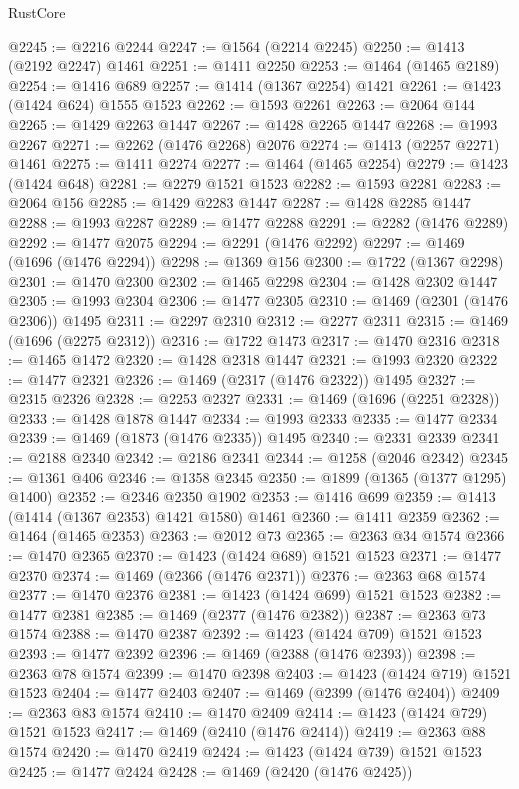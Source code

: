 \begin{lexlean}{RustCore}
\begin{coremodule}
@2245 := @2216 @2244
@2247 := @1564 (@2214 @2245)
@2250 := @1413 (@2192 @2247) @1461
@2251 := @1411 @2250
@2253 := @1464 (@1465 @2189)
@2254 := @1416 @689
@2257 := @1414 (@1367 @2254) @1421
@2261 := @1423 (@1424 @624) @1555 @1523
@2262 := @1593 @2261
@2263 := @2064 @144
@2265 := @1429 @2263 @1447
@2267 := @1428 @2265 @1447
@2268 := @1993 @2267
@2271 := @2262 (@1476 @2268) @2076
@2274 := @1413 (@2257 @2271) @1461
@2275 := @1411 @2274
@2277 := @1464 (@1465 @2254)
@2279 := @1423 (@1424 @648)
@2281 := @2279 @1521 @1523
@2282 := @1593 @2281
@2283 := @2064 @156
@2285 := @1429 @2283 @1447
@2287 := @1428 @2285 @1447
@2288 := @1993 @2287
@2289 := @1477 @2288
@2291 := @2282 (@1476 @2289)
@2292 := @1477 @2075
@2294 := @2291 (@1476 @2292)
@2297 := @1469 (@1696 (@1476 @2294))
@2298 := @1369 @156
@2300 := @1722 (@1367 @2298)
@2301 := @1470 @2300
@2302 := @1465 @2298
@2304 := @1428 @2302 @1447
@2305 := @1993 @2304
@2306 := @1477 @2305
@2310 := @1469 (@2301 (@1476 @2306)) @1495
@2311 := @2297 @2310
@2312 := @2277 @2311
@2315 := @1469 (@1696 (@2275 @2312))
@2316 := @1722 @1473
@2317 := @1470 @2316
@2318 := @1465 @1472
@2320 := @1428 @2318 @1447
@2321 := @1993 @2320
@2322 := @1477 @2321
@2326 := @1469 (@2317 (@1476 @2322)) @1495
@2327 := @2315 @2326
@2328 := @2253 @2327
@2331 := @1469 (@1696 (@2251 @2328))
@2333 := @1428 @1878 @1447
@2334 := @1993 @2333
@2335 := @1477 @2334
@2339 := @1469 (@1873 (@1476 @2335)) @1495
@2340 := @2331 @2339
@2341 := @2188 @2340
@2342 := @2186 @2341
@2344 := @1258 (@2046 @2342)
@2345 := @1361 @406
@2346 := @1358 @2345
@2350 := @1899 (@1365 (@1377 @1295) @1400)
@2352 := @2346 @2350 @1902
@2353 := @1416 @699
@2359 := @1413 (@1414 (@1367 @2353) @1421 @1580) @1461
@2360 := @1411 @2359
@2362 := @1464 (@1465 @2353)
@2363 := @2012 @73
@2365 := @2363 @34 @1574
@2366 := @1470 @2365
@2370 := @1423 (@1424 @689) @1521 @1523
@2371 := @1477 @2370
@2374 := @1469 (@2366 (@1476 @2371))
@2376 := @2363 @68 @1574
@2377 := @1470 @2376
@2381 := @1423 (@1424 @699) @1521 @1523
@2382 := @1477 @2381
@2385 := @1469 (@2377 (@1476 @2382))
@2387 := @2363 @73 @1574
@2388 := @1470 @2387
@2392 := @1423 (@1424 @709) @1521 @1523
@2393 := @1477 @2392
@2396 := @1469 (@2388 (@1476 @2393))
@2398 := @2363 @78 @1574
@2399 := @1470 @2398
@2403 := @1423 (@1424 @719) @1521 @1523
@2404 := @1477 @2403
@2407 := @1469 (@2399 (@1476 @2404))
@2409 := @2363 @83 @1574
@2410 := @1470 @2409
@2414 := @1423 (@1424 @729) @1521 @1523
@2417 := @1469 (@2410 (@1476 @2414))
@2419 := @2363 @88 @1574
@2420 := @1470 @2419
@2424 := @1423 (@1424 @739) @1521 @1523
@2425 := @1477 @2424
@2428 := @1469 (@2420 (@1476 @2425))

\end{coremodule}
\end{lexlean}
